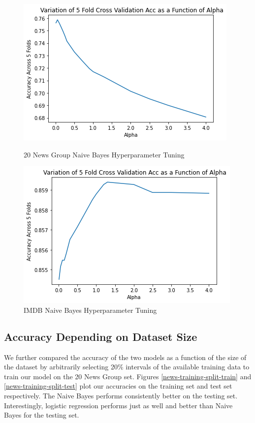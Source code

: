 \documentclass[11pt]{homework}
\begin{document}
\begin{figure}[h!]
  \centering
  \begin{minipage}[h]{0.3\textwidth}
    \includegraphics[width=\textwidth]{news-nb-hyperparamater-tuning.png}
    \caption{20 News Group Naive Bayes Hyperparameter Tuning}\label{news-nb-hyperparameter-tuning}
  \end{minipage}
\hspace{1.5cm}
 \begin{minipage}[h]{0.3\textwidth}
    \includegraphics[width=\textwidth]{imdb-nb-hyperparamater-tuning.png}
    \caption{IMDB Naive Bayes Hyperparameter Tuning}\label{imdb-nb-hyperparameter-tuning}
  \end{minipage}
\end{figure}

\subsection{Accuracy Depending on Dataset Size}
We further compared the accuracy of the two models as a function of the size of the dataset by arbitrarily selecting 20\% intervals of the available training data to train our model on the 20 News Group set. Figures \ref{news-training-split-train} and \ref{news-training-split-test} plot our accuracies on the training set and test set respectively. The Naive Bayes performs consistently better on the testing set. Interestingly, logistic regression performs just as well and better than Naive Bayes for the testing set. 
\end{document}
